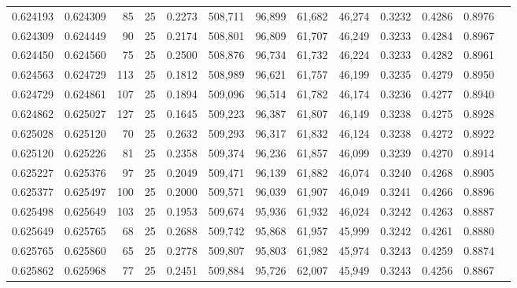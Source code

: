 \begin{tabular}{rrrrrrrrrrrrr}
0.624193 & 0.624309 &    85 &  25 &                                     0.2273 & 508,711 &  96,899 &  61,682 &  46,274 & 0.3232 & 0.4286 & 0.8976 \\
0.624309 & 0.624449 &    90 &  25 &                                     0.2174 & 508,801 &  96,809 &  61,707 &  46,249 & 0.3233 & 0.4284 & 0.8967 \\
0.624450 & 0.624560 &    75 &  25 &                                     0.2500 & 508,876 &  96,734 &  61,732 &  46,224 & 0.3233 & 0.4282 & 0.8961 \\
0.624563 & 0.624729 &   113 &  25 &                                     0.1812 & 508,989 &  96,621 &  61,757 &  46,199 & 0.3235 & 0.4279 & 0.8950 \\
0.624729 & 0.624861 &   107 &  25 &                                     0.1894 & 509,096 &  96,514 &  61,782 &  46,174 & 0.3236 & 0.4277 & 0.8940 \\
0.624862 & 0.625027 &   127 &  25 &                                     0.1645 & 509,223 &  96,387 &  61,807 &  46,149 & 0.3238 & 0.4275 & 0.8928 \\
0.625028 & 0.625120 &    70 &  25 &                                     0.2632 & 509,293 &  96,317 &  61,832 &  46,124 & 0.3238 & 0.4272 & 0.8922 \\
0.625120 & 0.625226 &    81 &  25 &                                     0.2358 & 509,374 &  96,236 &  61,857 &  46,099 & 0.3239 & 0.4270 & 0.8914 \\
0.625227 & 0.625376 &    97 &  25 &                                     0.2049 & 509,471 &  96,139 &  61,882 &  46,074 & 0.3240 & 0.4268 & 0.8905 \\
0.625377 & 0.625497 &   100 &  25 &                                     0.2000 & 509,571 &  96,039 &  61,907 &  46,049 & 0.3241 & 0.4266 & 0.8896 \\
0.625498 & 0.625649 &   103 &  25 &                                     0.1953 & 509,674 &  95,936 &  61,932 &  46,024 & 0.3242 & 0.4263 & 0.8887 \\
0.625649 & 0.625765 &    68 &  25 &                                     0.2688 & 509,742 &  95,868 &  61,957 &  45,999 & 0.3242 & 0.4261 & 0.8880 \\
0.625765 & 0.625860 &    65 &  25 &                                     0.2778 & 509,807 &  95,803 &  61,982 &  45,974 & 0.3243 & 0.4259 & 0.8874 \\
0.625862 & 0.625968 &    77 &  25 &                                     0.2451 & 509,884 &  95,726 &  62,007 &  45,949 & 0.3243 & 0.4256 & 0.8867 \\

\end{tabular}

